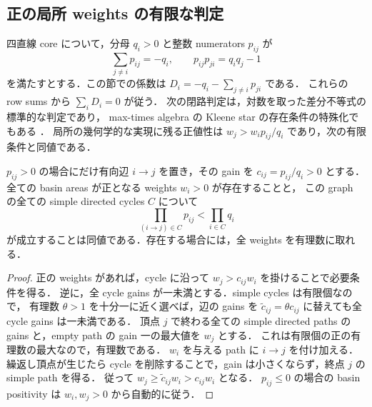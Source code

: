 
\subsection{正の局所 weights の有限な判定}
\label{kl10:positivity-section}

四直線 core について，分母 $q_i>0$ と整数 numerators $p_{ij}$ が
\[
 \sum_{j\ne i}p_{ij}=-q_i,
 \qquad p_{ij}p_{ji}=q_iq_j-1
\]
を満たすとする．この節での係数は
$D_i=-q_i-\sum_{j\ne i}p_{ji}$ である．
これらの row sums から $\sum_iD_i=0$ が従う．
次の閉路判定は，対数を取った差分不等式の標準的な判定であり，
max-times algebra の Kleene star の存在条件の特殊化でもある
\cite[\S2, Theorem~2.2 (arXiv version)]{SergeevSchneiderButkovic}．
局所の幾何学的な実現に残る正値性は
$w_j>w_i p_{ij}/q_i$ であり，次の有限条件と同値である．

\begin{lemma}\label{kl10:cycle-positive}
$p_{ij}>0$ の場合にだけ有向辺 $i\to j$ を置き，その gain を
$c_{ij}=p_{ij}/q_i>0$ とする．
全ての basin areas が正となる weights $w_i>0$ が存在することと，
この graph の全ての simple directed cycles $C$ について
\begin{equation}\label{kl10:cycle-test}
 \prod_{(i\to j)\in C}p_{ij}<\prod_{i\in C}q_i
\end{equation}
が成立することは同値である．存在する場合には，全 weights を有理数に取れる．
\end{lemma}

\begin{proof}
正の weights があれば，cycle に沿って $w_j>c_{ij}w_i$ を掛けることで必要条件を得る．
逆に，全 cycle gains が一未満とする．simple cycles は有限個なので，
有理数 $\theta>1$ を十分一に近く選べば，辺の gains を
$\widetilde c_{ij}=\theta c_{ij}$ に替えても全 cycle gains は一未満である．
頂点 $j$ で終わる全ての simple directed paths の gains と，empty path の gain 一の最大値を $w_j$ とする．
これは有限個の正の有理数の最大なので，有理数である．
$w_i$ を与える path に $i\to j$ を付け加える．
繰返し頂点が生じたら cycle を削除することで，gain は小さくならず，終点 $j$ の simple path を得る．
従って $w_j\geq\widetilde c_{ij}w_i>c_{ij}w_i$ となる．
$p_{ij}\leq0$ の場合の basin positivity は $w_i,w_j>0$ から自動的に従う．
\end{proof}

